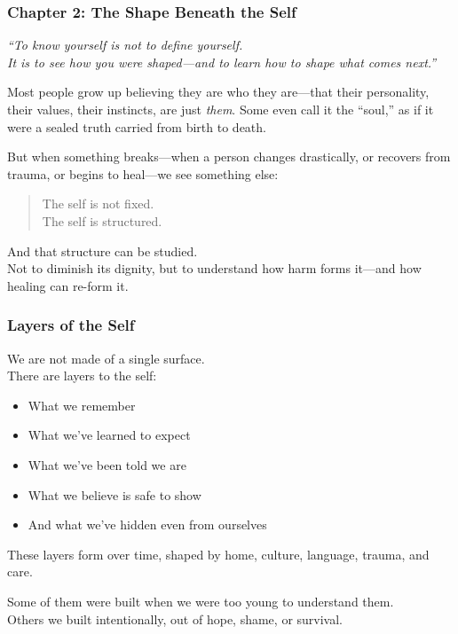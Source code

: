 \subsubsection{\texorpdfstring{\textbf{Chapter 2: The Shape Beneath the
Self}}{Chapter 2: The Shape Beneath the Self}}\label{chapter-2-the-shape-beneath-the-self}

\emph{``To know yourself is not to define yourself.\\
It is to see how you were shaped---and to learn how to shape what comes
next.''}

Most people grow up believing they are who they are---that their
personality, their values, their instincts, are just \emph{them}. Some
even call it the ``soul,'' as if it were a sealed truth carried from
birth to death.

But when something breaks---when a person changes drastically, or
recovers from trauma, or begins to heal---we see something else:

\begin{quote}
The self is not fixed.\\
The self is structured.
\end{quote}

And that structure can be studied.\\
Not to diminish its dignity, but to understand how harm forms it---and
how healing can re-form it.

\subsubsection{\texorpdfstring{\textbf{Layers of the
Self}}{Layers of the Self}}\label{layers-of-the-self}

We are not made of a single surface.\\
There are layers to the self:

\begin{itemize}
\item
  What we remember
\item
  What we've learned to expect
\item
  What we've been told we are
\item
  What we believe is safe to show
\item
  And what we've hidden even from ourselves
\end{itemize}

These layers form over time, shaped by home, culture, language, trauma,
and care.

Some of them were built when we were too young to understand them.\\
Others we built intentionally, out of hope, shame, or survival.

